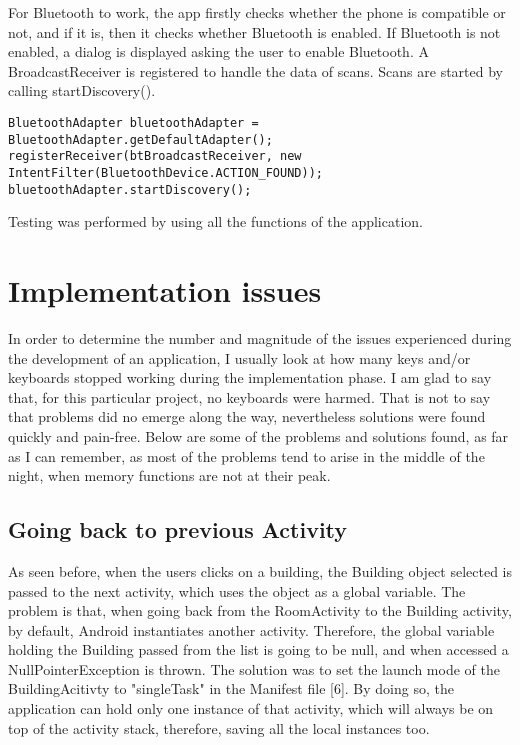 For Bluetooth to work, the app firstly checks whether the phone is compatible or not, and if it is, then it checks whether Bluetooth is enabled. If Bluetooth is not enabled, a dialog is displayed asking the user to enable Bluetooth. A BroadcastReceiver is registered to handle the data of scans. Scans are started by calling startDiscovery().
\begin{lstlisting}
BluetoothAdapter bluetoothAdapter = BluetoothAdapter.getDefaultAdapter();
registerReceiver(btBroadcastReceiver, new IntentFilter(BluetoothDevice.ACTION_FOUND));
bluetoothAdapter.startDiscovery();
\end{lstlisting}

Testing was performed by using all the functions of the application.
\section{Implementation issues}
In order to determine the number and magnitude of the issues experienced during the development of an application, I usually look at how many keys and/or keyboards stopped working during the implementation phase. I am glad to say that, for this particular project, no keyboards were harmed. That is not to say that problems did no emerge along the way, nevertheless solutions were found quickly and pain-free. Below are some of the problems and solutions found, as far as I can remember, as most of the problems tend to arise in the middle of the night, when memory functions are not at their peak.

\subsection{Going back to previous Activity}
As seen before, when the users clicks on a building, the Building object selected is passed to the next activity, which uses the object as a global variable. The problem is that, when going back from the RoomActivity to the Building activity, by default, Android instantiates another activity. Therefore, the global variable holding the Building passed from the list is going to be null, and when accessed a NullPointerException is thrown. The solution was to set the launch mode of the BuildingAcitivty to "singleTask" in the Manifest file [6]. By doing so, the application can hold only one instance of that activity, which will always be on top of the activity stack, therefore, saving all the local instances too.

